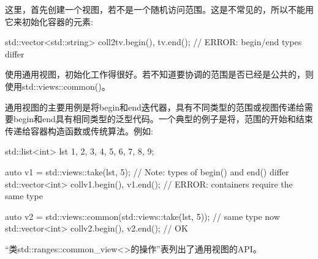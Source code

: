 这里，首先创建一个视图，若不是一个随机访问范围。这是不常见的，所以不能用它来初始化容器的元素:

\begin{cpp}
std::vector<std::string> coll2{tv.begin(), tv.end()}; // ERROR: begin/end types differ
\end{cpp}

使用通用视图，初始化工作得很好。若不知道要协调的范围是否已经是公共的，则使用std::views::common()。

通用视图的主要用例是将begin和end迭代器，具有不同类型的范围或视图传递给需要begin和end具有相同类型的泛型代码。一个典型的例子是将，范围的开始和结束传递给容器构造函数或传统算法。例如:

\begin{cpp}
std::list<int> lst {1, 2, 3, 4, 5, 6, 7, 8, 9};

auto v1 = std::views::take(lst, 5); // Note: types of begin() and end() differ
std::vector<int> coll{v1.begin(), v1.end()}; // ERROR: containers require the same type

auto v2 = std::views::common(std::views::take(lst, 5)); // same type now
std::vector<int> coll{v2.begin(), v2.end()}; // OK
\end{cpp}


“类std::ranges::common\_view<>的操作”表列出了通用视图的API。


